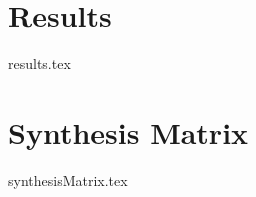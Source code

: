 \documentclass[print,ms]{unothesis}
\begin{document}
\chapter{Results}
{results.tex}



\backmatter

\nocite{*}



\appendix
\chapter{Synthesis Matrix}
{synthesisMatrix.tex}
\end{document}
